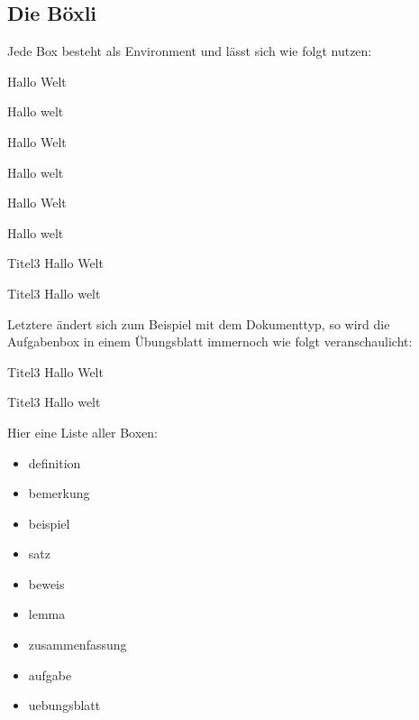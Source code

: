 \subsection[Wie funktionieren Boxen]{Die Böxli}
Jede Box besteht als Environment und lässt sich wie folgt nutzen:
\begin{multicols}{2}
\begin{definition}[Titel]
    Hallo Welt
\begin{latex*}
\begin{definition}[Titel]
    Hallo welt
\end{definition}
\end{latex*}
\end{definition}

\begin{lemma}
    Hallo Welt
\begin{latex*}
\begin{lemma}
    Hallo welt
\end{lemma}
\end{latex*}
\end{lemma}

\begin{satz}[Titel]
    Hallo Welt
\begin{latex*}
\begin{satz}[Titel]
    Hallo welt
\end{satz}
\end{latex*}
\end{satz}
\def\LILLYxBOXxAufgabexBox{FALSE}
\begin{aufgabe}{Titel}{3}
    Hallo Welt
\begin{latex*}
\begin{aufgabe}{Titel}{3}
    Hallo welt
\end{aufgabe}
\end{latex*}
\end{aufgabe}
\end{multicols}
Letztere ändert sich zum Beispiel mit dem Dokumenttyp, so wird die Aufgabenbox in einem Übungsblatt immernoch wie folgt veranschaulicht:
\def\LILLYxBOXxAufgabexBox{TRUE}
\begin{aufgabe}{Titel}{3}
    Hallo Welt
\begin{latex*}
\begin{aufgabe}{Titel}{3}
    Hallo welt
\end{aufgabe}
\end{latex*}
\end{aufgabe}
Hier eine Liste aller Boxen:
\begin{multicols}{3}
    \begin{itemize}[label=$\diamond$]\narrowitems
        \item definition
        \item bemerkung
        \item beispiel
        \item satz
        \item beweis
        \item lemma
        \item zusammenfassung
        \item aufgabe
        \item uebungsblatt
    \end{itemize}
\end{multicols}
